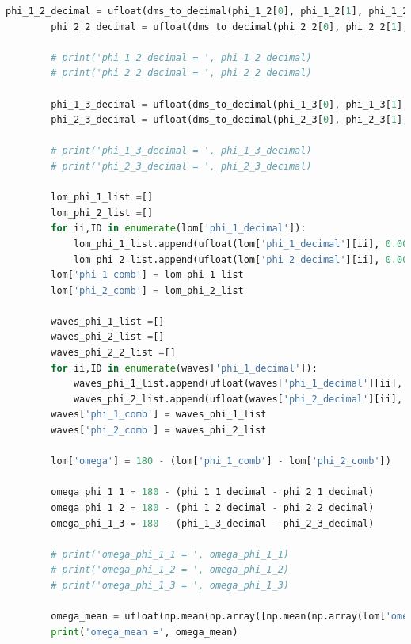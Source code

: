 \documentclass[a4paper,11pt]{article}
\begin{document}
\begin{lstlisting}[language=Python, basicstyle=\tiny, breaklines=true]
        phi_1_2_decimal = ufloat(dms_to_decimal(phi_1_2[0], phi_1_2[1], phi_1_2[2]), 0.000277778)
        phi_2_2_decimal = ufloat(dms_to_decimal(phi_2_2[0], phi_2_2[1], phi_2_2[2]), 0.000277778)
        
        # print('phi_1_2_decimal = ', phi_1_2_decimal)
        # print('phi_2_2_decimal = ', phi_2_2_decimal)
        
        phi_1_3_decimal = ufloat(dms_to_decimal(phi_1_3[0], phi_1_3[1], phi_1_3[2]), 0.000277778)
        phi_2_3_decimal = ufloat(dms_to_decimal(phi_2_3[0], phi_2_3[1], phi_2_3[2]), 0.000277778)
        
        # print('phi_1_3_decimal = ', phi_1_3_decimal)
        # print('phi_2_3_decimal = ', phi_2_3_decimal)
        
        lom_phi_1_list =[]
        lom_phi_2_list =[]
        for ii,ID in enumerate(lom['phi_1_decimal']):
            lom_phi_1_list.append(ufloat(lom['phi_1_decimal'][ii], 0.000277778))
            lom_phi_2_list.append(ufloat(lom['phi_2_decimal'][ii], 0.000277778))
        lom['phi_1_comb'] = lom_phi_1_list
        lom['phi_2_comb'] = lom_phi_2_list
        
        waves_phi_1_list =[]
        waves_phi_2_list =[]
        waves_phi_2_2_list =[]
        for ii,ID in enumerate(waves['phi_1_decimal']):
            waves_phi_1_list.append(ufloat(waves['phi_1_decimal'][ii], 0.000277778))
            waves_phi_2_list.append(ufloat(waves['phi_2_decimal'][ii], 0.000277778))
        waves['phi_1_comb'] = waves_phi_1_list
        waves['phi_2_comb'] = waves_phi_2_list
        
        lom['omega'] = 180 - (lom['phi_1_comb'] - lom['phi_2_comb'])
        
        omega_phi_1_1 = 180 - (phi_1_1_decimal - phi_2_1_decimal)
        omega_phi_1_2 = 180 - (phi_1_2_decimal - phi_2_2_decimal)
        omega_phi_1_3 = 180 - (phi_1_3_decimal - phi_2_3_decimal)
        
        # print('omega_phi_1_1 = ', omega_phi_1_1)
        # print('omega_phi_1_2 = ', omega_phi_1_2)
        # print('omega_phi_1_3 = ', omega_phi_1_3)

        omega_mean = ufloat(np.mean(np.array([np.mean(np.array(lom['omega'].apply(lambda x: x.nominal_value))), omega_phi_1_1.nominal_value, omega_phi_1_2.nominal_value, omega_phi_1_3.nominal_value])), np.sqrt(np.std(np.array([np.mean(np.array(lom['omega'].apply(lambda x: x.nominal_value))), omega_phi_1_1.nominal_value, omega_phi_1_2.nominal_value, omega_phi_1_3.nominal_value]))**2 + 0.000277778**2))
        print('omega_mean =', omega_mean)
        

\end{lstlisting}
\end{document}
